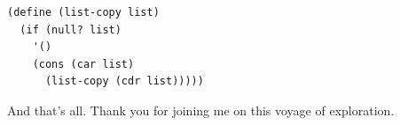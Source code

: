 \documentclass[a5paper,draft]{memoir}
\begin{document}
\begin{lstlisting}
(define (list-copy list)
  (if (null? list)
    '()
    (cons (car list)
      (list-copy (cdr list)))))
\end{lstlisting}



\bigskip\bigskip\noindent And that's all. Thank you for joining me on this voyage of exploration.

\backmatter
\printindex
\newpage 
\pagestyle{empty}

\ %

\newpage
\end{document}
